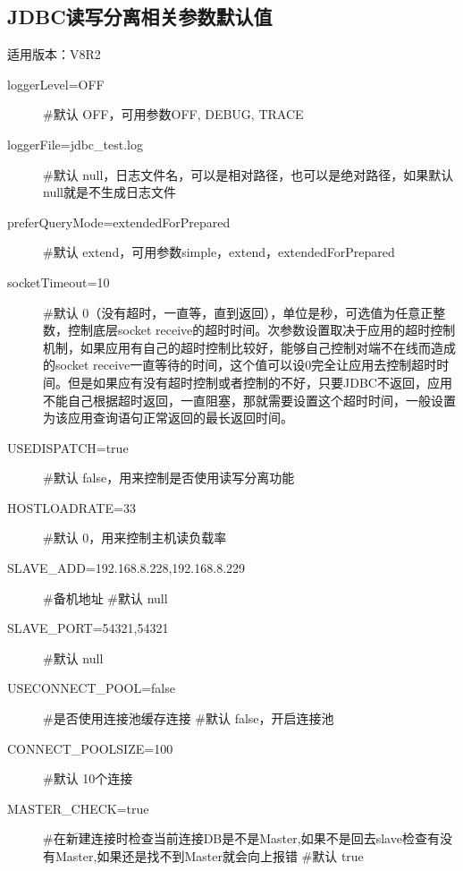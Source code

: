 \documentclass[a4,10pt,oneside,english]{sphinxmanual}
\begin{document}
\subsection{JDBC读写分离相关参数默认值}
\label{\detokenize{interface/jdbc:id10}}
适用版本：V8R2
\begin{description}
\item[{loggerLevel=OFF}] \leavevmode
\#默认 OFF，可用参数OFF, DEBUG, TRACE

\item[{loggerFile=jdbc\_test.log}] \leavevmode
\#默认 null，日志文件名，可以是相对路径，也可以是绝对路径，如果默认null就是不生成日志文件

\item[{preferQueryMode=extendedForPrepared}] \leavevmode
\#默认 extend，可用参数simple，extend，extendedForPrepared

\item[{socketTimeout=10}] \leavevmode
\#默认 0（没有超时，一直等，直到返回），单位是秒，可选值为任意正整数，控制底层socket receive的超时时间。次参数设置取决于应用的超时控制机制，如果应用有自己的超时控制比较好，能够自己控制对端不在线而造成的socket receive一直等待的时间，这个值可以设0完全让应用去控制超时时间。但是如果应有没有超时控制或者控制的不好，只要JDBC不返回，应用不能自己根据超时返回，一直阻塞，那就需要设置这个超时时间，一般设置为该应用查询语句正常返回的最长返回时间。

\item[{USEDISPATCH=true}] \leavevmode
\#默认 false，用来控制是否使用读写分离功能

\item[{HOSTLOADRATE=33}] \leavevmode
\#默认 0，用来控制主机读负载率

\item[{SLAVE\_ADD=192.168.8.228,192.168.8.229}] \leavevmode
\#备机地址
\#默认 null

\item[{SLAVE\_PORT=54321,54321}] \leavevmode
\#默认 null

\item[{USECONNECT\_POOL=false}] \leavevmode
\#是否使用连接池缓存连接
\#默认 false，开启连接池

\item[{CONNECT\_POOLSIZE=100}] \leavevmode
\#默认 10个连接

\item[{MASTER\_CHECK=true}] \leavevmode
\#在新建连接时检查当前连接DB是不是Master,如果不是回去slave检查有没有Master,如果还是找不到Master就会向上报错
\#默认 true


\end{description}
\end{document}
